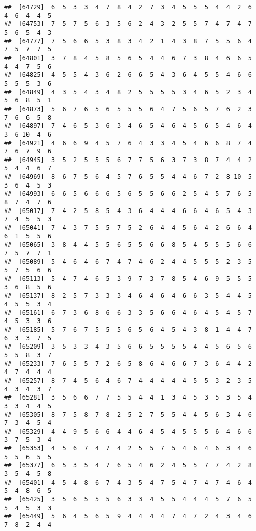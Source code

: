\documentclass[
]{book}
\begin{document}
\begin{verbatim}
##  [64729]  6  5  3  3  4  7  8  4  2  7  3  4  5  5  5  4  4  2  6  4  6  4  4  5
##  [64753]  7  5  7  5  6  3  5  6  2  4  3  2  5  5  7  4  7  4  7  5  6  5  4  3
##  [64777]  7  5  6  6  5  3  8  3  4  2  1  4  3  8  7  5  5  6  4  7  5  7  7  5
##  [64801]  3  7  8  4  5  8  5  6  5  4  4  6  7  3  8  4  6  6  5  4  4  7  5  6
##  [64825]  4  5  5  4  3  6  2  6  6  5  4  3  6  4  5  5  4  6  6  5  5  5  3  6
##  [64849]  4  3  5  4  3  4  8  2  5  5  5  5  3  4  6  5  2  3  4  5  6  8  5  1
##  [64873]  5  6  7  6  5  6  5  5  5  6  4  7  5  6  5  7  6  2  3  7  6  6  5  8
##  [64897]  7  4  6  5  3  6  3  4  6  5  4  6  4  5  6  5  4  6  4  3  6 10  4  6
##  [64921]  4  6  6  9  4  5  7  6  4  3  3  4  5  4  6  6  8  7  4  7  6  7  9  6
##  [64945]  3  5  2  5  5  5  6  7  7  5  6  3  7  3  8  7  4  4  2  5  4  4  6  7
##  [64969]  8  6  7  5  6  4  5  7  6  5  5  4  4  6  7  2  8 10  5  3  6  4  5  3
##  [64993]  6  6  5  6  6  6  5  6  5  5  6  6  2  5  4  5  7  6  5  8  7  4  7  6
##  [65017]  7  4  2  5  8  5  4  3  6  4  4  4  6  6  4  6  5  4  3  7  4  5  5  3
##  [65041]  7  4  3  7  5  5  7  5  2  6  4  4  5  6  4  2  6  6  4  6  1  5  5  6
##  [65065]  3  8  4  4  5  5  6  5  5  6  6  8  5  4  5  5  5  6  6  7  5  7  7  1
##  [65089]  5  4  6  4  6  7  4  7  4  6  2  4  4  5  5  5  2  3  5  5  7  5  6  6
##  [65113]  5  4  7  4  6  5  3  9  7  3  7  8  5  4  6  9  5  5  5  3  6  8  5  6
##  [65137]  8  2  5  7  3  3  3  4  6  4  6  4  6  6  3  5  4  4  5  4  5  5  3  4
##  [65161]  6  7  3  6  8  6  6  3  3  5  6  6  4  6  4  5  4  5  7  4  5  3  3  6
##  [65185]  5  7  6  7  5  5  5  6  5  6  4  5  4  3  8  1  4  4  7  6  3  3  7  5
##  [65209]  3  5  3  3  4  3  5  6  6  5  5  5  5  4  4  5  6  5  6  5  5  8  3  7
##  [65233]  7  6  5  5  7  2  6  5  8  6  4  6  6  7  3  6  4  4  2  4  7  4  4  4
##  [65257]  8  7  4  5  6  4  6  7  4  4  4  4  4  5  5  3  2  3  5  4  3  4  3  7
##  [65281]  3  5  6  6  7  7  5  5  4  4  1  3  4  5  3  5  3  5  4  3  3  4  4  5
##  [65305]  8  7  5  8  7  8  2  5  2  7  5  5  4  4  5  6  3  4  6  7  3  4  5  4
##  [65329]  4  4  9  5  6  6  4  4  6  4  5  4  5  5  5  6  4  6  6  3  7  5  3  4
##  [65353]  4  5  6  7  4  7  4  2  5  5  7  5  4  6  4  6  3  4  6  5  5  6  5  5
##  [65377]  6  5  3  5  4  7  6  5  4  6  2  4  5  5  7  7  4  2  8  3  5  4  5  8
##  [65401]  4  5  4  8  6  7  4  3  5  4  7  5  4  7  4  7  4  6  4  5  4  8  6  5
##  [65425]  3  5  6  5  5  5  6  3  3  4  5  5  4  4  4  5  7  6  5  5  4  5  3  3
##  [65449]  5  6  4  5  6  5  9  4  4  4  4  7  4  7  2  4  3  4  6  7  8  2  4  4

\end{verbatim}
\end{document}
